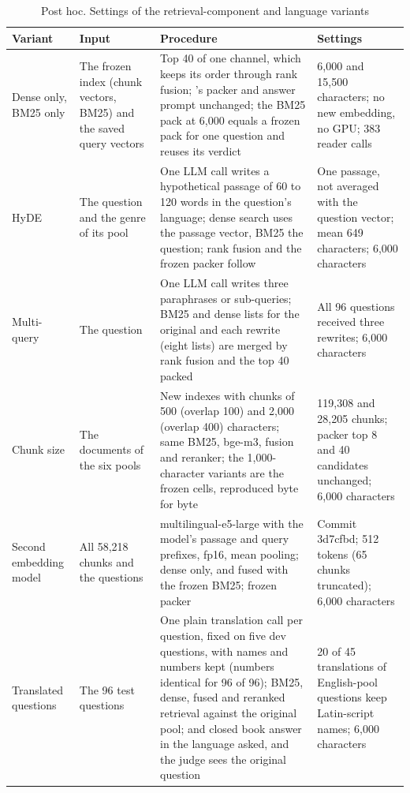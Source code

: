 \begin{table}[tp]
\caption{Post hoc. Settings of the retrieval-component and language variants}
\label{tab:posthoc-settings3}
\centering
\scriptsize
\setlength{\tabcolsep}{3pt}
\begin{tabularx}{\textwidth}{@{}p{2.6cm}p{2.9cm}Xp{2.8cm}@{}}
\toprule
Variant & Input & Procedure & Settings \\
\midrule
Dense only, BM25 only & The frozen \hybrid{} index (chunk vectors, BM25) and the saved query vectors & Top 40 of one channel, which keeps its order through rank fusion; \hybrid{}'s packer and answer prompt unchanged; the BM25 pack at 6,000 equals a frozen pack for one question and reuses its verdict & 6,000 and 15,500 characters; no new embedding, no GPU; 383 reader calls \\
HyDE & The question and the genre of its pool & One LLM call writes a hypothetical passage of 60 to 120 words in the question's language; dense search uses the passage vector, BM25 the question; rank fusion and the frozen packer follow & One passage, not averaged with the question vector; mean 649 characters; 6,000 characters \\
Multi-query & The question & One LLM call writes three paraphrases or sub-queries; BM25 and dense lists for the original and each rewrite (eight lists) are merged by rank fusion and the top 40 packed & All 96 questions received three rewrites; 6,000 characters \\
Chunk size & The documents of the six pools & New indexes with chunks of 500 (overlap 100) and 2,000 (overlap 400) characters; same BM25, bge-m3, fusion and reranker; the 1,000-character variants are the frozen cells, reproduced byte for byte & 119,308 and 28,205 chunks; packer top 8 and 40 candidates unchanged; 6,000 characters \\
Second embedding model & All 58,218 chunks and the questions & multilingual-e5-large with the model's passage and query prefixes, fp16, mean pooling; dense only, and fused with the frozen BM25; frozen packer & Commit 3d7cfbd; 512 tokens (65 chunks truncated); 6,000 characters \\
Translated questions & The 96 test questions & One plain translation call per question, fixed on five dev questions, with names and numbers kept (numbers identical for 96 of 96); BM25, dense, fused and reranked retrieval against the original pool; \hr{} and closed book answer in the language asked, and the judge sees the original question & 20 of 45 translations of English-pool questions keep Latin-script names; 6,000 characters \\

\end{tabularx}
\end{table}
